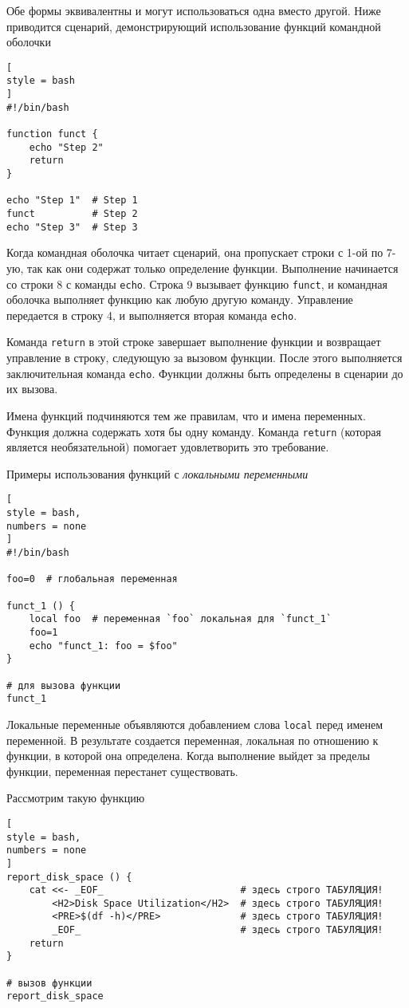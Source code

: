 \documentclass[%
	11pt,
	a4paper,
	utf8,
		]{article}
\begin{document}
Обе формы эквивалентны и могут использоваться одна вместо другой. Ниже приводится сценарий, демонстрирующий использование функций командной оболочки
\begin{lstlisting}[
style = bash
]
#!/bin/bash

function funct {
    echo "Step 2"
    return
}

echo "Step 1"  # Step 1
funct          # Step 2
echo "Step 3"  # Step 3
\end{lstlisting}

Когда командная оболочка читает сценарий, она пропускает строки с 1-ой по 7-ую, так как они содержат только определение функции. Выполнение начинается со строки 8 с команды \texttt{echo}. Строка 9 вызывает функцию \texttt{funct}, и командная оболочка выполняет функцию как любую другую команду. Управление передается в строку 4, и выполняется вторая команда \texttt{echo}.

Команда \texttt{return} в этой строке завершает выполнение функции и возвращает управление в строку, следующую за вызовом функции. После этого выполняется заключительная команда \texttt{echo}. Функции должны быть определены в сценарии до их вызова.

Имена функций подчиняются тем же правилам, что и имена переменных. Функция должна содержать хотя бы одну команду. Команда \texttt{return} (которая является необязательной) помогает удовлетворить это требование.

Примеры использования функций с \emph{локальными переменными}

\begin{lstlisting}[
style = bash,
numbers = none
]
#!/bin/bash

foo=0  # глобальная переменная

funct_1 () {
    local foo  # переменная `foo` локальная для `funct_1`
    foo=1
    echo "funct_1: foo = $foo"
}

# для вызова функции
funct_1
\end{lstlisting}

Локальные переменные объявляются добавлением слова \texttt{local} перед именем переменной. В результате создается переменная, локальная по отношению к функции, в которой она определена. Когда выполнение выйдет за пределы функции, переменная перестанет существовать.

Рассмотрим такую функцию
\begin{lstlisting}[
style = bash,
numbers = none
]
report_disk_space () {
    cat <<- _EOF_                        # здесь строго ТАБУЛЯЦИЯ!
        <H2>Disk Space Utilization</H2>  # здесь строго ТАБУЛЯЦИЯ!
        <PRE>$(df -h)</PRE>              # здесь строго ТАБУЛЯЦИЯ!
        _EOF_                            # здесь строго ТАБУЛЯЦИЯ!
    return
}

# вызов функции
report_disk_space
\end{lstlisting}
\end{document}

